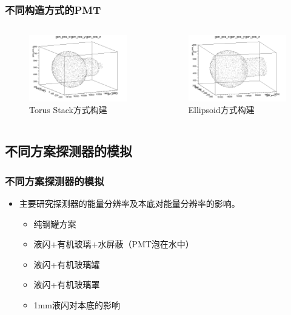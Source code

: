 \begin{frame}
    \frametitle{不同构造方式的PMT}
    \begin{columns}
        \column{6.0cm}
        \begin{figure}
            \includegraphics[width=6cm,keepaspectratio]{data/torusstack_PMT.png}
            \caption{Torus Stack方式构建}
        \end{figure}
        \column{6.0cm}
        \begin{figure}
            \includegraphics[width=6cm,keepaspectratio]{data/ellipsoid_PMT.png}
            \caption{Ellipsoid方式构建}
        \end{figure}
    \end{columns}
\end{frame}

\subsection{不同方案探测器的模拟}

\begin{frame}
    \frametitle{不同方案探测器的模拟}
    \begin{itemize}
        \item 主要研究探测器的能量分辨率及本底对能量分辨率的影响。
            \begin{itemize}
                \item 纯钢罐方案
                \item 液闪+有机玻璃+水屏蔽（PMT泡在水中）
                \item 液闪+有机玻璃罐
                \item 液闪+有机玻璃罩
                \item 1mm液闪对本底的影响
            \end{itemize}
    \end{itemize}
\end{frame}

